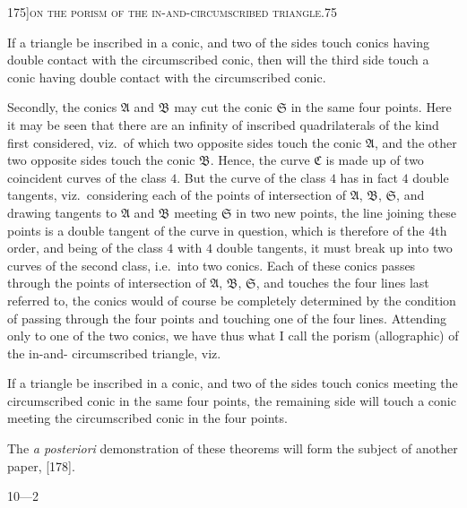 \documentclass[11pt]{article}
\begin{document}
\newpage

\begin{center}
\small 175]\hfill\textsc{on the porism of the in-and-circumscribed triangle.}\hfill\textsc{75}
\end{center}

\medskip

\noindent If a triangle be inscribed in a conic, and two of the sides touch conics having
double contact with the circumscribed conic, then will the third side touch a conic
having double contact with the circumscribed conic.

Secondly, the conics $\mathfrak{A}$ and $\mathfrak{B}$ may cut the conic $\mathfrak{S}$ in the same four points.
Here it may be seen that there are an infinity of inscribed quadrilaterals of the
kind first considered, viz.\ of which two opposite sides touch the conic $\mathfrak{A}$, and the
other two opposite sides touch the conic $\mathfrak{B}$. Hence, the curve $\mathfrak{C}$ is made up of
two coincident curves of the class $4$. But the curve of the class $4$ has in fact $4$
double tangents, viz.\ considering each of the points of intersection of $\mathfrak{A}$, $\mathfrak{B}$, $\mathfrak{S}$, and
drawing tangents to $\mathfrak{A}$ and $\mathfrak{B}$ meeting $\mathfrak{S}$ in two new points, the line joining these
points is a double tangent of the curve in question, which is therefore of the 4th
order, and being of the class $4$ with $4$ double tangents, it must break up into two
curves of the second class, i.e.\ into two conics. Each of these conics passes through
the points of intersection of $\mathfrak{A}$, $\mathfrak{B}$, $\mathfrak{S}$, and touches the four lines last referred to,
the conics would of course be completely determined by the condition of passing
through the four points and touching one of the four lines. Attending only to one
of the two conics, we have thus what I call the porism (allographic) of the in-and-
circumscribed triangle, viz.

If a triangle be inscribed in a conic, and two of the sides touch conics meeting
the circumscribed conic in the same four points, the remaining side will touch a
conic meeting the circumscribed conic in the four points.

The \emph{a posteriori} demonstration of these theorems will form the subject of an\-other paper, [178].

\bigskip
\hfill 10---2
\end{document}
